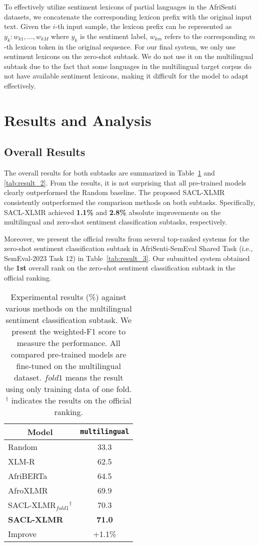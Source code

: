 \documentclass[11pt]{article}
\begin{document}
To effectively utilize sentiment lexicons of partial languages in
the AfriSenti datasets, we concatenate the corresponding lexicon prefix with the original input text. Given the $i$-th input sample, the lexicon prefix can be represented as 
$y_k: w_{k1}, ..., w_{kM}$ where $y_k$ is the sentiment label, $w_{km}$ refers to the corresponding $m$-th lexicon token in the original sequence. 
For our final system, we only use sentiment lexicons on the zero-shot subtask. We do not use it on the multilingual subtask due to the fact that some languages in the multilingual target corpus do not have available sentiment lexicons, making it difficult for the model to adapt effectively.

\section{Results and Analysis}

\subsection{Overall Results}
The overall results  for both subtasks are summarized in Table~\ref{tab:result_1} and \ref{tab:result_2}. 
From the results, it is not surprising that all pre-trained models clearly outperformed the Random baseline. The proposed SACL-XLMR consistently outperformed the comparison methods on both subtasks. 
Specifically, SACL-XLMR achieved \textbf{1.1\%} and \textbf{2.8\%} absolute improvements on the multilingual and zero-shot sentiment classification subtasks, respectively.


Moreover, we present the official results from
several top-ranked systems for the zero-shot sentiment classification subtask in AfriSenti-SemEval Shared Task (i.e., SemEval-2023 Task 12) in Table~\ref{tab:result_3}.
Our submitted system obtained the \textbf{1st} overall rank on the zero-shot sentiment classification subtask in the official ranking.



\begin{table}[t]
\centering
\begin{tabular}{l|c}
\hline
\multicolumn{1}{c|}{\multirow{1}{*}{Model}} & \texttt{multilingual} \\
\hline
Random      & 33.3 \\ 
XLM-R       & 62.5 \\
AfriBERTa   & 64.5 \\
AfroXLMR    & 69.9 \\
\hline
SACL-XLMR$_{fold1}$$^\dagger$     & 70.3 \\ 
\textbf{SACL-XLMR}  & \textbf{71.0} \\ 
Improve     & +1.1\% \\
\hline
\end{tabular}
\caption{
Experimental results (\%) against various methods on the multilingual sentiment classification subtask.
We present the weighted-F1 score to measure the performance.
All compared pre-trained models are fine-tuned on the multilingual dataset.
${fold1}$ means the result using only training data of one fold.
$^\dagger$ indicates the results on the official ranking.
}
\label{tab:result_1}
\end{table}
\end{document}
